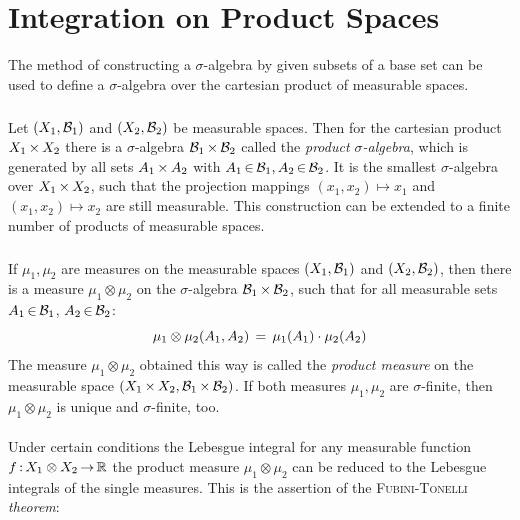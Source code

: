 \documentclass[11pt,twoside]{article}
\begin{document}
\section{Integration on Product Spaces}
The method of constructing a $\sigma$-algebra by given subsets
of a base set can be used to define a $\sigma$-algebra over the
cartesian product of measurable spaces.

\subparagraph{}
Let $(X_1,{\salgB}_1)$ and $(X_2,{\salgB}_2)$ be measurable spaces.
Then for the cartesian product $\cross{X_1}{X_2}$
there is a $\sigma$-algebra $\cross{{\salgB}_1}{{\salgB}_2}$
called the \textit{product $\sigma$-algebra},
which is generated by all sets $\cross{A_1}{A_2}$
with $A_1 \xeof \salgB_1, A_2 \xeof \salgB_2$.
It is the smallest $\sigma$-algebra over $\cross{X_1}{X_2}$,
such that the projection mappings $(x_1,x_2) \mapsto x_1$ and
$(x_1,x_2) \mapsto x_2$ are still measurable.
This construction can be extended to a finite number of products
of measurable spaces.

\subparagraph{}
If $\mu_1,\mu_2$ are measures on the measurable spaces
$(X_1,{\salgB}_1)$ and $(X_2,{\salgB}_2)$,
then there is a measure $\mu_1 \otimes \mu_2$ on the $\sigma$-algebra
$\cross{{\salgB}_1}{{\salgB}_2}$,
such that for all measurable sets $A_1 \xeof \salgB_1$, $A_2 \xeof \salgB_2$:
\[
\mu_1 \otimes \mu_2(A_1,A_2) \= \mu_1(A_1) \cdot \mu_2(A_2)
\]
The measure $\mu_1 \otimes \mu_2$ obtained this way is called
the \textit{product measure} on the measurable space
$(\cross{X_1}{X_2}, \cross{\salgB_1}{\salgB_2})$.
If both measures $\mu_1,\mu_2$ are $\sigma$-finite,
then $\mu_1 \otimes \mu_2$ is unique and $\sigma$-finite, too.

\paragraph{}
Under certain conditions
the Lebesgue integral for any measurable function
$f \: X_1 \otimes X_2 \xto \R$ {\wrt} the product measure $\mu_1 \otimes \mu_2$
can be reduced to the Lebesgue integrals of the single measures.
This is the assertion of the \textsc{Fubini-Tonelli} \textit{theorem}:
\end{document}
